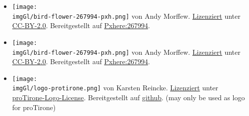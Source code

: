 \begin{itemize}
   \item \texttt{[image: \\imgGl/bird-flower-267994-pxh.png]} von Andy Morffew. \href{https://pxhere.com/en/photo/267994}{Lizenziert} unter \href{https://creativecommons.org/licenses/by/2.0/}{CC-BY-2.0}. Bereitgestellt auf \href{https://pxhere.com/en/photo/267994}{Pxhere:267994}.
   \item \texttt{[image: \\imgGl/bird-flower-267994-pxh.png]} von Andy Morffew. \href{https://pxhere.com/en/photo/267994}{Lizenziert} unter \href{https://creativecommons.org/licenses/by/2.0/}{CC-BY-2.0}. Bereitgestellt auf \href{https://pxhere.com/en/photo/267994}{Pxhere:267994}.
   \item \texttt{[image: \\imgGl/logo-protirone.png]} von Karsten Reincke. \href{https://github.com/kreincke/proTironeComputatri/blob/main/LICENSING.md}{Lizenziert} unter \href{https://github.com/kreincke/proTironeComputatri/blob/main/LICENSING.md}{proTirone-Logo-License}. Bereitgestellt auf \href{https://github.com/kreincke/proTironeComputatri/}{github}. (may only be used as logo for proTirone)
\end{itemize}
